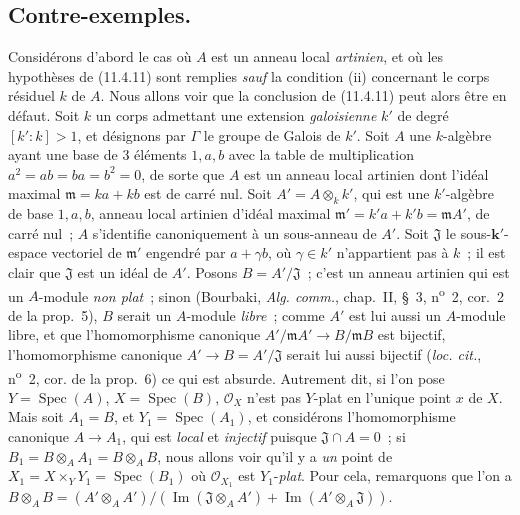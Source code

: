 \subsection{Contre-exemples.}
\label{subsection:IV.11.7-fr}

\begin{env}[11.7.1]
\label{IV.11.7.1-fr}
Considérons d'abord le cas où $A$ est un anneau local \emph{artinien}, et où les
hypothèses de (11.4.11) sont remplies \emph{sauf} la condition (ii) concernant
le corps résiduel $k$ de $A$. Nous allons voir que la conclusion de (11.4.11)
peut alors être en défaut. Soit $k$ un corps admettant une extension
\emph{galoisienne} $k'$ de degré $[k':k]>1$, et désignons par $\Gamma$ le groupe
de Galois de $k'$. Soit $A$ une $k$-algèbre ayant une base de 3 éléments
$1,a,b$ avec la table de multiplication $a^2=ab=ba=b^2=0$, de sorte que $A$ est
un anneau local artinien dont l'idéal maximal $\mathfrak m=ka+kb$ est de carré
nul. Soit $A'=A\otimes_k k'$, qui est une $k'$-algèbre de base $1,a,b$, anneau
local artinien d'idéal maximal
$\mathfrak m'=k'a+k'b=\mathfrak m A'$, de carré nul~; $A$ s'identifie
canoniquement à un sous-anneau de $A'$. Soit $\mathfrak J$ le sous-$\boldsymbol{k}'$-espace
vectoriel de $\mathfrak m'$ engendré par $a+\gamma b$, où $\gamma\in k'$
n'appartient pas à $k$~; il est clair que $\mathfrak J$ est un idéal de $A'$.
Posons $B=A'/\mathfrak J$~; c'est un anneau artinien qui est un $A$-module
\emph{non plat}~; sinon (Bourbaki, \emph{Alg. comm.}, chap.~II, \S~3,
n\textsuperscript{o}~2, cor.~2 de la prop.~5), $B$ serait un $A$-module \emph{libre}~;
comme $A'$ est lui aussi un $A$-module libre, et que l'homomorphisme canonique
$A'/\mathfrak m A'\to B/\mathfrak m B$ est bijectif, l'homomorphisme canonique
$A'\to B=A'/\mathfrak J$ serait lui
aussi bijectif (\emph{loc. cit.}, n\textsuperscript{o}~2, cor. de la prop.~6) ce qui est
absurde. Autrement dit, si l'on pose $Y=\operatorname{Spec}(A)$,
$X=\operatorname{Spec}(B)$, $\mathcal O_X$ n'est pas $Y$-plat en l'unique point
$x$ de $X$. Mais soit $A_1=B$, et $Y_1=\operatorname{Spec}(A_1)$, et considérons
l'homomorphisme canonique $A\to A_1$, qui est \emph{local} et \emph{injectif} puisque
$\mathfrak J\cap A=0$~; si
$B_1=B\otimes_A A_1=B\otimes_A B$, nous allons voir qu'il y a \emph{un} point de
$X_1=X\times_Y Y_1=\operatorname{Spec}(B_1)$ où $\mathcal O_{X_1}$ est
$Y_1$-\emph{plat}. Pour cela, remarquons que l'on a
$B\otimes_A B=(A'\otimes_A A')/(\operatorname{Im}(\mathfrak J\otimes_A A')+\operatorname{Im}(A'\otimes_A\mathfrak J))$.

\end{env}
